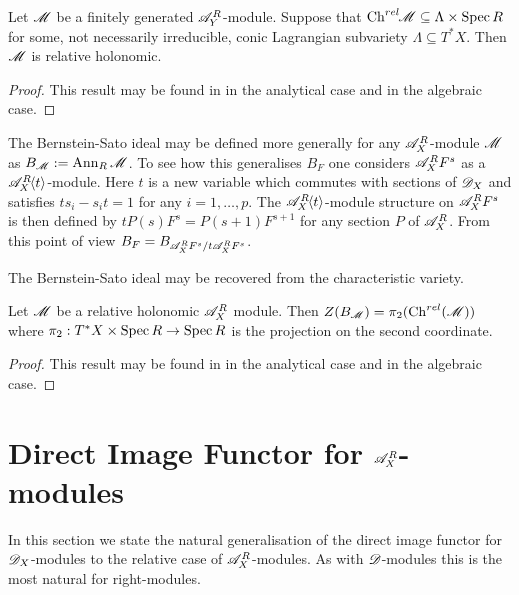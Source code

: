 \begin{lemma}\label{lem: InclusionCharVar}
  Let $\mathscr{M}$ be a finitely generated $\mathscr{A}_Y^R$-module. Suppose that $\operatorname{Ch}^{rel}\mkern-5mu \mathscr{M} \subseteq \Lambda \times \operatorname{Spec} R$ for some, not necessarily irreducible, conic Lagrangian subvariety $\Lambda\subseteq T^*X$. Then $\mathscr{M}$ is relative holonomic.
\end{lemma}
\begin{proof}
  This result may be found in \cite{maisonobe2016filtration} in the analytical case and \cite{budur2019zero} in the algebraic case.
\end{proof}
The Bernstein-Sato ideal may be defined more generally for any $\mathscr{A}_X^R$-module $\mathscr{M}$ as $B_{\mathscr{M}} := \operatorname{Ann}_{R}\mathscr{M}$. To see how this generalises $B_F$ one considers $\mathscr{A}_X^R F^s$ as a $\mathscr{A}_X^R\mkern-5mu\left\langle t \right\rangle$-module.
Here $t$ is a new variable which commutes with sections of $\mathscr{D}_X$ and satisfies $ts_i - s_it = 1$ for any $i=1,\ldots,
p$.  The $\mathscr{A}_X^R\mkern-5mu\left\langle t \right\rangle$-module structure on $\mathscr{A}_X^R F^s$ is then defined by $tP(s)F^s = P(s+1)F^{s + 1}$ for any section $P$ of $\mathscr{A}_X^R$. From this point of view $B_F = B_{\mathscr{A}_X^R F^s / t\mathscr{A}_X^R F^s}$.

The Bernstein-Sato ideal may be recovered from the characteristic variety.
\begin{proposition}\label{prop: ProjectionBernsteinSatoRelativeChar}
  Let $\mathscr{M}$ be a relative holonomic $\mathscr{A}_X^R$ module. Then  $Z(B_{\mathscr{M}}) = \pi_2(\operatorname{Ch}^{rel}(\mathscr{M}))$ where $\pi_2:T^*X\times \operatorname{Spec} R \to \operatorname{Spec} R$ is the projection on the second coordinate.
\end{proposition}
\begin{proof}
  This result may be found in \cite{maisonobe2016filtration} in the analytical case and \cite{budur2019zero} in the algebraic case.
\end{proof}
\section{Direct Image Functor for $\mathscr{A}_X^R$-modules}
    In this section we state the natural generalisation of the direct image functor for $\mathscr{D}_X$-modules to the relative case of $\mathscr{A}_X^R$-modules. As with $\mathscr{D}$-modules this is the most natural for right-modules.

